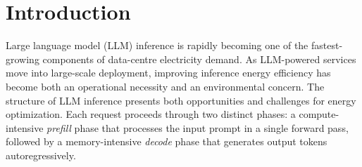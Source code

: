\section{Introduction}
\label{sec:intro}


Large language model (LLM) inference is rapidly becoming one of the fastest-growing components of data-centre electricity demand.
As LLM-powered services move into large-scale deployment, improving inference energy efficiency has become both an operational necessity and an environmental concern.
The structure of LLM inference presents both opportunities and challenges for energy optimization.
Each request proceeds through two distinct phases: a compute-intensive \emph{prefill} phase that processes the input prompt in a single forward pass, followed by a memory-intensive \emph{decode} phase that generates output tokens autoregressively.
